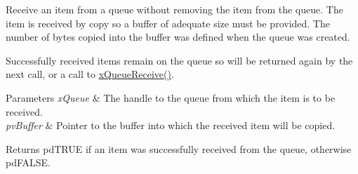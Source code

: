 Receive an item from a queue without removing the item from the queue. The item is received by copy so a buffer of adequate size must be provided. The number of bytes copied into the buffer was defined when the queue was created.

Successfully received items remain on the queue so will be returned again by the next call, or a call to \hyperlink{vendor_2ceedling_2plugins_2freertos_2src_2freertos_2include_2queue_8h_af1549eac0e7f05694a59a0b967c80be3}{x\+Queue\+Receive()}.


\begin{DoxyParams}{Parameters}
{\em x\+Queue} & The handle to the queue from which the item is to be received.\\
\hline
{\em pv\+Buffer} & Pointer to the buffer into which the received item will be copied.\\
\hline
\end{DoxyParams}
\begin{DoxyReturn}{Returns}
pd\+T\+R\+UE if an item was successfully received from the queue, otherwise pd\+F\+A\+L\+SE. 
\end{DoxyReturn}
